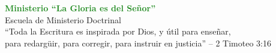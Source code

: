 \documentclass[12pt,a4paper]{article}
\begin{document}
\vspace{2cm}
\begin{center}
\textcolor{forestgreen}{\large\textbf{Ministerio ``La Gloria es del Señor''}}\\
\textcolor{olivegreen}{Escuela de Ministerio Doctrinal}\\
\textcolor{sagegreen}{``Toda la Escritura es inspirada por Dios, y útil para enseñar,\\para redargüir, para corregir, para instruir en justicia'' -- 2 Timoteo 3:16}
\end{center}
\end{document}
